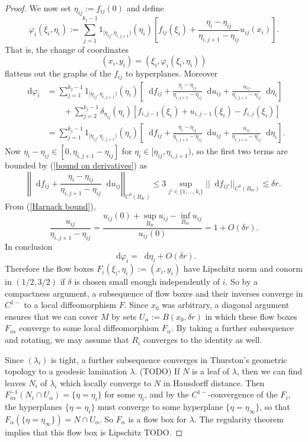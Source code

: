 \documentclass[reqno,11pt]{amsart}
\newcommand*\dif{\mathop{}\!\mathrm{d}}
\theoremstyle{definition}
\numberwithin{equation}{section}
\begin{document}
\begin{proof}
We now set $\eta_{ij} := f_{ij}(0)$ and define
$$\varphi_i(\xi_i, \eta_i) := \sum_{j=1}^{k_j - 1} 1_{[\eta_{ij}, \eta_{i,j+1})}(\eta_i) \left[f_{ij}(\xi_i) + \frac{\eta_i - \eta_{ij}}{\eta_{i,j+1} - \eta_{ij}} u_{ij}(x_i)\right].$$
That is, the change of coordinates
$$(x_i, y_i) = (\xi_i, \varphi_i(\xi_i, \eta_i))$$
flattens out the graphs of the $f_{ij}$ to hyperplanes.
Moreover
\begin{align*}
\dif \varphi_i &= \sum_{j=1}^{k_j - 1} 1_{[\eta_{ij}, \eta_{i, j + 1})}(\eta_i) \left[\dif f_{ij} + \frac{\eta_i - \eta_{ij}}{\eta_{i,j+1} - \eta_{ij}} \dif u_{ij} + \frac{u_{ij}}{\eta_{i,j+1} - \eta_{ij}} \dif \eta_i\right] \\
&\qquad + \sum_{j = 2}^{k_j - 1} \delta_{\eta_{ij}}(\eta_i)\left[f_{i,j-1}(\xi_i) + u_{i,j-1}(\xi_i) - f_{i,j}(\xi_i)\right] \\
&= \sum_{j=1}^{k_j - 1} 1_{[\eta_{ij}, \eta_{i, j + 1})}(\eta_i) \left[\dif f_{ij} + \frac{\eta_i - \eta_{ij}}{\eta_{i,j+1} - \eta_{ij}} \dif u_{ij} + \frac{u_{ij}}{\eta_{i,j+1} - \eta_{ij}} \dif \eta_i\right].
\end{align*}
Now $\eta_i - \eta_{ij} \in [0, \eta_{i, j + 1} - \eta_{ij}]$ for $\eta_i \in [\eta_{ij}, \eta_{i,j+1})$, so the first two terms are bounded by (\ref{bound on derivatives}) as
$$\left|\left|\dif f_{ij} + \frac{\eta_i - \eta_{ij}}{\eta_{i,j+1} - \eta_{ij}} \dif u_{ij}\right|\right|_{C^0(B_{\delta r})}
\leq 3\sup_{j' \in \{1, \dots, k_i\}} ||\dif f_{ij'}||_{C^0(B_{\delta r})}
\lesssim \delta r.$$
From (\ref{Harnack bound}),
$$\frac{u_{ij}}{\eta_{i,j+1} - \eta_{ij}} = \frac{u_{ij}(0) + \sup_{B_{\delta r}} u_{ij} - \inf_{B_{\delta r}} u_{ij}}{u_{ij}(0)} = 1 + O(\delta r).$$
In conclusion
$$\dif \varphi_i = \dif \eta_i + O(\delta r).$$
Therefore the flow boxes $F_i(\xi_i, \eta_i) := (x_i, y_i)$ have Lipschitz norm and conorm in $(1/2, 3/2)$ if $\delta$ is chosen small enough independently of $i$.
So by a compactness argument, a subsequence of flow boxes and their inverses converge in $C^{1-}$ to a local diffeomorphism $F$.
Since $x_0$ was arbitrary, a diagonal argument ensures that we can cover $M$ by sets $U_\alpha := B(x_0, \delta r)$ in which these flow boxes $F_{i\alpha}$ converge to some local diffeomorphism $F_\alpha$.
By taking a further subsequence and rotating, we may assume that $R_i$ converges to the identity as well.

Since $(\lambda_i)$ is tight, a further subsequence converges in Thurston's geometric topology to a geodesic lamination $\lambda$. (TODO)
If $N$ is a leaf of $\lambda$, then we can find leaves $N_i$ of $\lambda_i$ which locally converge to $N$ in Hausdorff distance.
Then $F_{i\alpha}^{-1}(N_i \cap U_\alpha) = \{\eta = \eta_i\}$ for some $\eta_i$, and by the $C^{1-}$-convergence of the $F_i$, the hyperplanes $\{\eta = \eta_i\}$ must converge to some hyperplane $\{\eta = \eta_\infty\}$, so that $F_\alpha(\{\eta = \eta_\infty\}) = N \cap U_\alpha$.
So $F_\alpha$ is a flow box for $\lambda$.
The regularity theorem implies that this flow box is Lipschitz TODO.


\end{proof}
\end{document}
